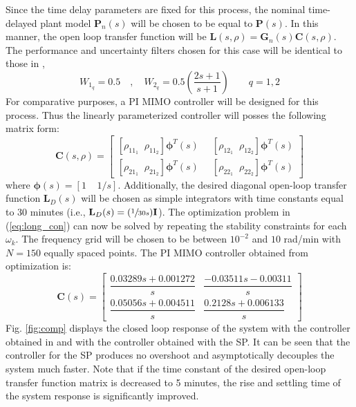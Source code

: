 \documentclass[A4, 10pt, conference]{ieeeconf}
\renewcommand{\vec}[1]{\mathbf{#1}}
\begin{document}
Since the time delay parameters are fixed for this process, the nominal time-delayed plant model $\mathbf{P}_n(s)$ will be chosen to be equal to $\mathbf{P}(s)$. In this manner, the open loop transfer function will be $\mathbf{L}(s,\rho)=\mathbf{G}_n(s)\mathbf{C}(s,\rho)$. The performance and uncertainty filters chosen for this case will be identical to those in \cite{GKL10b},
\begin{equation}
W_{1_{q}}=0.5 \quad , \quad W_{2_{q}}=0.5\left(\frac{2s+1}{s+1}\right) \qquad q=1,2
\end{equation}
For comparative purposes, a PI MIMO controller will be designed for this process. Thus the linearly parameterized controller will posses the following matrix form:
\begin{equation}
\renewcommand{\arraystretch}{1.3}
\vec{C}(s,\rho)=
\begin{bmatrix}
[\rho_{11_{1}} \;\; \rho_{11_{2}}]\vec{\phi}^T(s) & \;\; [\rho_{12_{1}} \;\; \rho_{12_{2}}]\vec{\phi}^T(s) \\
[\rho_{21_{1}} \;\; \rho_{21_{2}}]\vec{\phi}^T(s) & \;\; [\rho_{22_{1}} \;\; \rho_{22_{2}}]\vec{\phi}^T(s)
\end{bmatrix}
\end{equation}
where $\vec{\phi}(s)=\left[1 \;\;\;\; 1/s\right]$.
Additionally, the desired diagonal open-loop transfer function $\mathbf{L}_D(s)$ will be chosen as simple integrators with time constants equal to 30 minutes (i.e., $\vec{L}_D(s)=(\sfrac{1}{30s})\vec{I}$). The optimization problem in (\ref{eq:long_con}) can now be solved by repeating the stability constraints for each $\omega_k$. 
The frequency grid will be chosen to be between $10^{-2}$ and $10$ rad/min with $N=150$ equally spaced points. The PI MIMO controller obtained from optimization is:
$$
\renewcommand{\arraystretch}{1.3}
\mathbf{C}(s)=
\begin{bmatrix}
\dfrac{0.03289s + 0.001272}{s} & \dfrac{-0.03511s - 0.00311}{s} \\[0.4em]
\dfrac{0.05056s + 0.004511}{s} & \dfrac{0.2128s + 0.006133}{s}
\end{bmatrix}
$$
Fig. \ref{fig:comp} displays the closed loop response of the system with the controller obtained in \cite{GKL10b} and with the controller obtained with the SP. It can be seen that the controller for the SP produces no overshoot and asymptotically decouples the system much faster. Note that if the time constant of the desired open-loop transfer function matrix is decreased to 5 minutes, the rise and settling time of the system response is significantly improved.  
\end{document}
